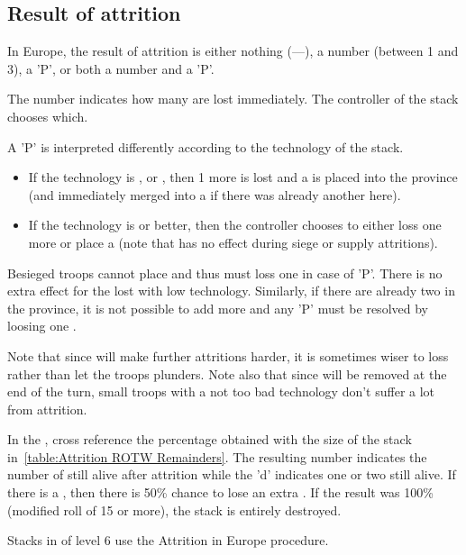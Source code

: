 \subsection{Result of attrition}
In Europe, the result of attrition is either nothing (---), a number
(between 1 and 3), a 'P', or both a number and a 'P'.

The number indicates how many \LD are lost immediately. The controller of the
stack chooses which.

A 'P' is interpreted differently according to the technology of the stack.
\begin{itemize}
\item If the technology is \TMED, \TREN or \TARQ, then 1 more \LD is lost and
  a \PILLAGE\facemoins is placed into the province (and immediately merged
  into a \PILLAGE\faceplus if there was already another \PILLAGE\facemoins
  here).
\item If the technology is \TMUS or better, then the controller chooses to
  either loss one more \LD or place a \PILLAGE\facemoins (note that
   has no effect during siege or supply attritions).
\end{itemize}

Besieged troops cannot place \PILLAGE and thus must loss one \LD in case of
'P'. There is no extra effect for the lost \PILLAGE with low
technology. Similarly, if there are already two \PILLAGE\faceplus in the
province, it is not possible to add more and any 'P' must be resolved by
loosing one \LD.

Note that since \PILLAGE will make further attritions harder, it is sometimes
wiser to loss \LD rather than let the troops plunders. Note also that since
\PILLAGE\facemoins will be removed at the end of the turn, small troops with a
not too bad technology don't suffer a lot from attrition.

\smallskip

In the \ROTW, cross reference the percentage obtained with the size of the
stack in~\ref{table:Attrition ROTW Remainders}. The resulting number indicates
the number of \LD still alive after attrition while the 'd' indicates one or
two \LDE still alive. If there is a \textetoile, then there is 50\% chance to
lose an extra \LDE. If the result was 100\% (modified roll of 15 or more), the
stack is entirely destroyed.

Stacks in \COL of level 6 use the Attrition in Europe procedure.


